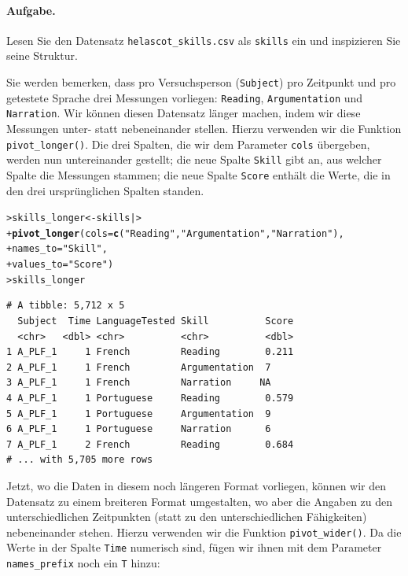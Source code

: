 \documentclass[oneside, 10pt]{book}\usepackage[]{graphicx}\usepackage[]{xcolor}
\makeatletter
\newcommand{\hlstr}[1]{\textcolor[rgb]{0.192,0.494,0.8}{#1}}%
\newcommand{\hlstd}[1]{\textcolor[rgb]{0.345,0.345,0.345}{#1}}%
\newcommand{\hlkwb}[1]{\textcolor[rgb]{0.69,0.353,0.396}{#1}}%
\newcommand{\hlkwc}[1]{\textcolor[rgb]{0.333,0.667,0.333}{#1}}%
\newcommand{\hlkwd}[1]{\textcolor[rgb]{0.737,0.353,0.396}{\textbf{#1}}}%
\newenvironment{kframe}{%
 \def\at@end@of@kframe{}%
 \ifinner\ifhmode%
  \def\at@end@of@kframe{\end{minipage}}%
  \begin{minipage}{\columnwidth}%
 \fi\fi%
 \def\FrameCommand##1{\hskip\@totalleftmargin \hskip-\fboxsep
 \colorbox{shadecolor}{##1}\hskip-\fboxsep
     \hskip-\linewidth \hskip-\@totalleftmargin \hskip\columnwidth}%
 \MakeFramed {\advance\hsize-\width
   \@totalleftmargin\z@ \linewidth\hsize
   \@setminipage}}%
 {\par\unskip\endMakeFramed%
 \at@end@of@kframe}
\newenvironment{knitrout}{}{} %
\makeatother
\begin{document}
\paragraph{Aufgabe.} Lesen Sie den Datensatz \texttt{helascot\_skills.csv} als \texttt{skills} ein
und inspizieren Sie seine Struktur.\label{page:skills}



Sie werden bemerken, dass pro Versuchsperson
(\texttt{Subject}) pro Zeitpunkt und pro getestete Sprache drei Messungen
vorliegen: \texttt{Reading}, \texttt{Argumentation} und \texttt{Narration}.
Wir können diesen Datensatz länger machen, indem wir diese Messungen unter- statt
nebeneinander stellen. Hierzu verwenden wir die Funktion \texttt{pivot\_longer()}.
Die drei Spalten, die wir dem Parameter \texttt{cols} übergeben, werden nun
untereinander gestellt; die neue Spalte \texttt{Skill} gibt an, aus welcher
Spalte die Messungen stammen; die neue Spalte \texttt{Score} enthält die
Werte, die in den drei ursprünglichen Spalten standen.

\begin{knitrout}
\color{fgcolor}\begin{kframe}
\begin{alltt}
\hlstd{> }\hlstd{skills_longer} \hlkwb{<-} \hlstd{skills |>}
\hlstd{+ }  \hlkwd{pivot_longer}\hlstd{(}\hlkwc{cols} \hlstd{=} \hlkwd{c}\hlstd{(}\hlstr{"Reading"}\hlstd{,} \hlstr{"Argumentation"}\hlstd{,} \hlstr{"Narration"}\hlstd{),}
\hlstd{+ }               \hlkwc{names_to} \hlstd{=} \hlstr{"Skill"}\hlstd{,}
\hlstd{+ }               \hlkwc{values_to} \hlstd{=} \hlstr{"Score"}\hlstd{)}
\hlstd{> }\hlstd{skills_longer}
\end{alltt}
\begin{verbatim}
# A tibble: 5,712 x 5
  Subject  Time LanguageTested Skill          Score
  <chr>   <dbl> <chr>          <chr>          <dbl>
1 A_PLF_1     1 French         Reading        0.211
2 A_PLF_1     1 French         Argumentation  7    
3 A_PLF_1     1 French         Narration     NA    
4 A_PLF_1     1 Portuguese     Reading        0.579
5 A_PLF_1     1 Portuguese     Argumentation  9    
6 A_PLF_1     1 Portuguese     Narration      6    
7 A_PLF_1     2 French         Reading        0.684
# ... with 5,705 more rows
\end{verbatim}
\end{kframe}
\end{knitrout}

Jetzt, wo die Daten in diesem noch längeren Format vorliegen,
können wir den Datensatz zu einem breiteren Format umgestalten,
wo aber die Angaben zu den unterschiedlichen Zeitpunkten
(statt zu den unterschiedlichen Fähigkeiten) nebeneinander stehen.
Hierzu verwenden wir die Funktion \texttt{pivot\_wider()}.
Da die Werte in der Spalte \texttt{Time} numerisch sind, fügen
wir ihnen mit dem Parameter \texttt{names\_prefix} noch ein \texttt{T} hinzu:
\end{document}
